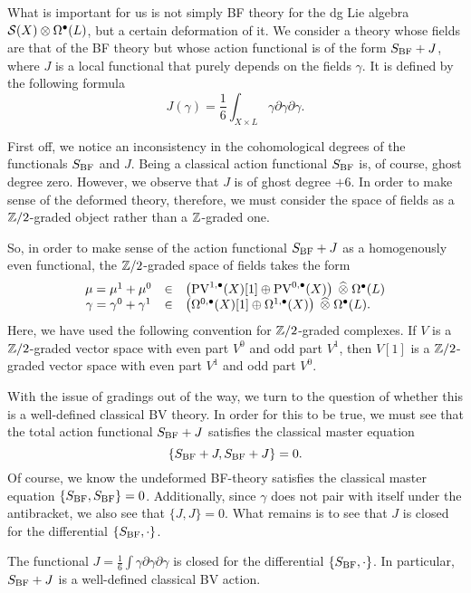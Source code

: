 \documentclass[11pt]{amsart}
\def\pv{{\rm PV}}
\begin{document}
What is important for us is not simply BF theory for the dg Lie algebra $\mathcal S(X) \otimes \Omega^\bullet(L)$, but a certain deformation of it.
We consider a theory whose fields are that of the BF theory but whose action functional is of the form $S_{\rm BF} + J$, where $J$ is a local functional that purely depends on the fields $\gamma$.
It is defined by the following formula
\[
J(\gamma) = \frac16 \int_{X\times L} \gamma \partial \gamma \partial \gamma .
\]

First off, we notice an inconsistency in the cohomological degrees of the functionals $S_{\rm BF}$ and $J$.
Being a classical action functional $S_{\rm BF}$ is, of course, ghost degree zero.
However, we observe that $J$ is of ghost degree $+6$.
In order to make sense of the deformed theory, therefore, we must consider the space of fields as a $\mathbb Z/2$-graded object rather than a $\mathbb Z$-graded one.

So, in order to make sense of the action functional $S_{\rm BF} + J$ as a homogenously even functional, the $\mathbb Z/2$-graded space of fields takes the form
\[
  \begin{array}{ccl}
    \mu = \mu^1+\mu^0 & \in & \left(\pv^{1,\bu}(X)[1] \oplus \pv^{0,\bu}(X) \right) \; \Hat{\otimes} \; \Omega^{\bu}(L) \\
    \gamma = \gamma^0+ \gamma^1 & \in & \left(\Omega^{0,\bu}(X)[1] \oplus \Omega^{1,\bu}(X) \right) \; \Hat{\otimes}\; \Omega^{\bu}(L) .
  \end{array}
\]
Here, we have used the following convention for $\mathbb Z/2$-graded complexes.
If $V$ is a $\mathbb Z/2$-graded vector space with even part $V^0$ and odd part $V^1$, then $V[1]$ is a $\mathbb Z/2$-graded vector space with even part $V^1$ and odd part $V^0$.

With the issue of gradings out of the way, we turn to the question of whether this is a well-defined classical BV theory.
In order for this to be true, we must see that the total action functional $S_{\rm BF} + J$ satisfies the classical master equation
\[
  \{S_{\rm BF} + J , S_{\rm BF} + J\} = 0 .
\]
Of course, we know the undeformed BF-theory satisfies the classical master equation $\{S_{\rm BF}, S_{\rm BF}\} = 0$.
Additionally, since $\gamma$ does not pair with itself under the antibracket, we also see that $\{J,J\}=0$.
What remains is to see that $J$ is closed for the differential $\{S_{\rm BF}, \cdot\}$.

\begin{lem}
The functional $J = \frac16\int \gamma \partial \gamma \partial \gamma$ is closed for the differential $\{S_{\rm BF},\cdot\}$.
In particular, $S_{\rm BF} + J$ is a well-defined classical BV action.
\end{lem}
\end{document}
